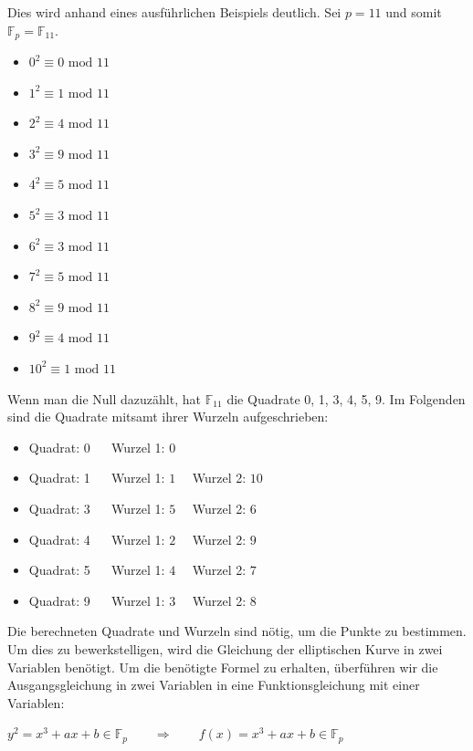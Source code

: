 Dies wird anhand eines ausführlichen Beispiels deutlich. Sei $p = 11$ und somit $\mathbb{F}_{p} = \mathbb{F}_{11}$. 

\begin{itemize}
\item $0^{2} \equiv 0 \text{ mod } 11$
\item $1^{2} \equiv 1 \text{ mod } 11$
\item $2^{2} \equiv 4 \text{ mod } 11$
\item $3^{2} \equiv 9 \text{ mod } 11$
\item $4^{2} \equiv 5 \text{ mod } 11$
\item $5^{2} \equiv 3 \text{ mod } 11$
\item $6^{2} \equiv 3 \text{ mod } 11$
\item $7^{2} \equiv 5 \text{ mod } 11$
\item $8^{2} \equiv 9 \text{ mod } 11$
\item $9^{2} \equiv 4 \text{ mod } 11$
\item $10^{2} \equiv 1 \text{ mod } 11$
\end{itemize}

Wenn man die Null dazuzählt, hat $\mathbb{F}_{11}$ die Quadrate 0, 1, 3, 4, 5, 9. Im Folgenden sind die Quadrate mitsamt ihrer Wurzeln aufgeschrieben:

\begin{itemize}
\item Quadrat: 0 $\quad$ Wurzel 1: $0$
\item Quadrat: 1 $\quad$ Wurzel 1: $1 \quad$ Wurzel 2: $10$
\item Quadrat: 3 $\quad$ Wurzel 1: $5 \quad$ Wurzel 2: $6$
\item Quadrat: 4 $\quad$ Wurzel 1: $2 \quad$ Wurzel 2: $9$
\item Quadrat: 5 $\quad$ Wurzel 1: $4 \quad$ Wurzel 2: $7$
\item Quadrat: 9 $\quad$ Wurzel 1: $3 \quad$ Wurzel 2: $8$
\end{itemize}

Die berechneten Quadrate und Wurzeln sind nötig, um die Punkte zu bestimmen. Um dies zu bewerkstelligen, wird die Gleichung der elliptischen Kurve in zwei Variablen benötigt. Um die benötigte Formel zu erhalten, überführen wir die Ausgangsgleichung in zwei Variablen in eine Funktionsgleichung mit einer Variablen:
\begin{center}
$y^{2} =  x^{3} + ax + b  \in \mathbb{F}_{p} \qquad \Longrightarrow \qquad f(x) =  x^{3} + ax + b \in \mathbb{F}_{p}$
\end{center}


